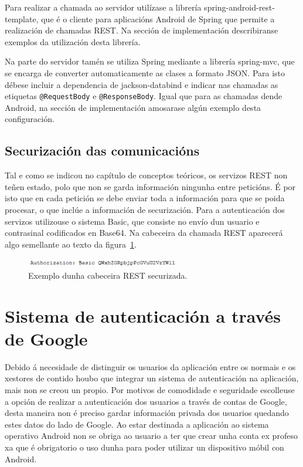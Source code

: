 Para realizar a chamada ao servidor utilízase a librería spring-android-rest-template, que é o cliente para aplicacións Android de Spring que permite a realización de chamadas REST. Na sección de implementación describiranse exemplos da utilización desta librería.

Na parte do servidor tamén se utiliza Spring mediante a librería spring-mvc, que se encarga de converter automaticamente as clases a formato JSON. Para isto débese incluir a dependencia de jackson-databind e indicar nas chamadas as etiquetas \lstinline{@RequestBody} e \lstinline{@ResponseBody}. Igual que para as chamadas dende Android, na sección de implementación amosarase algún exemplo desta configuración.

\subsection{Securización das comunicacións}
Tal e como se indicou no capítulo de conceptos teóricos, os servizos REST non teñen estado, polo que non se garda información ningunha entre peticións. É por isto que en cada petición se debe enviar toda a información para que se poida procesar, o que inclúe a información de securización.
Para a autenticación dos servizos utilizouse o sistema Basic, que consiste no envío dun usuario e contrasinal codificados en Base64. Na cabeceira da chamada REST aparecerá algo semellante ao texto da figura~\ref{fig:authorization}.

\begin{figure}[!h]
	\begin{center}
		\includegraphics[width=0.6\textwidth]{figures/codigo/authorization}
		\caption{Exemplo dunha cabeceira REST securizada.}
		\label{fig:authorization}
	\end{center}
\end{figure}


\section{Sistema de autenticación a través de Google}
Debido á necesidade de distinguir os usuarios da aplicación entre os normais e os xestores de contido houbo que integrar un sistema de autenticación na aplicación, mais non se creou un propio.
Por motivos de comodidade e seguridade escolleuse a opción de realizar a autenticación dos usuarios a través de contas de Google, desta maneira non é preciso gardar información privada dos usuarios quedando estes datos do lado de Google. Ao estar destinada a aplicación ao sistema operativo Android non se obriga ao usuario a ter que crear unha conta ex profeso xa que é obrigatorio o uso dunha para poder utilizar un dispositivo móbil con Android.

